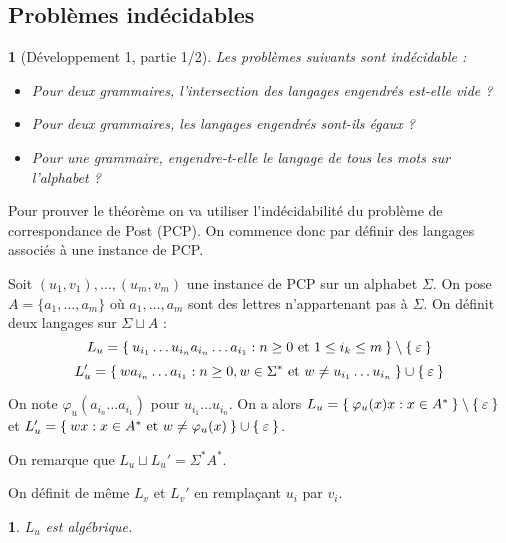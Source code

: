 \documentclass[11pt,a4paper]{article}
\theoremstyle{plain}
\theoremstyle{definition}
\theoremstyle{definition}
\theoremstyle{remark}
\theoremstyle{remark}
\theoremstyle{plain}
\newtheorem{lem}[thm]{\protect\lemmaname}
\theoremstyle{plain}
\newtheorem{prop}[thm]{\protect\propositionname}
\theoremstyle{plain}
\theoremstyle{remark}
\providecommand{\lemmaname}{Lemme}
\providecommand{\propositionname}{Proposition}
\begin{document}



\subsection{Problèmes indécidables}
\begin{prop}[Développement 1, partie 1/2]\label{thindec}
	Les problèmes suivants sont indécidable : %
	\begin{itemize}
		\item[1.] Pour deux grammaires, l'intersection des langages engendrés est-elle vide ?
		\item[2.] Pour deux grammaires, les langages engendrés sont-ils égaux ?
		\item[3.] Pour une grammaire, engendre-t-elle le langage de tous les mots sur l'alphabet ?
	\end{itemize}
\end{prop}

Pour prouver le théorème on va utiliser l'indécidabilité du  problème de correspondance de Post (PCP). On commence donc par définir des langages associés à une instance de PCP.

Soit $(u_1,v_1),\dots,(u_m,v_m)$ une instance de PCP sur un alphabet $\Sigma$. On pose $A=\{a_1,\dots, a_m\}$ où $a_1,\dots,a_m$ sont des lettres n'appartenant pas à $\Sigma$. On définit deux langages sur $\Sigma \sqcup A$ :
$$L_u=\Set{u_{i_1}\dots u_{i_n}a_{i_n}\dots a_{i_1} : n\ge 0\text{ et }1\le i_k \le m}\setminus \Set{\varepsilon}$$
$$L_u'=\Set{wa_{i_n}\dots a_{i_1} : n\ge 0, w\in\Sigma^*\text{ et }w\not=u_{i_1}\dots u_{i_n}}\cup \Set{\varepsilon}$$

On note $\varphi_u(a_{i_n}\dots a_{i_1})$ pour $u_{i_1}\dots u_{i_n}$. On a alors $L_u=\Set{\varphi_u(x)x : x \in A^*}\setminus \Set{\varepsilon}$ et $L_u'=\Set{wx : x \in A^*\text{ et } w\not=\varphi_u(x)}\cup \Set{\varepsilon}$.

On remarque que $L_u \sqcup L_u' = \Sigma^*A^*$.

On définit de même $L_v$ et $L_v'$ en remplaçant $u_i$ par $v_i$.

\begin{lem}
	$L_u$ est algébrique.
\end{lem}
\end{document}
